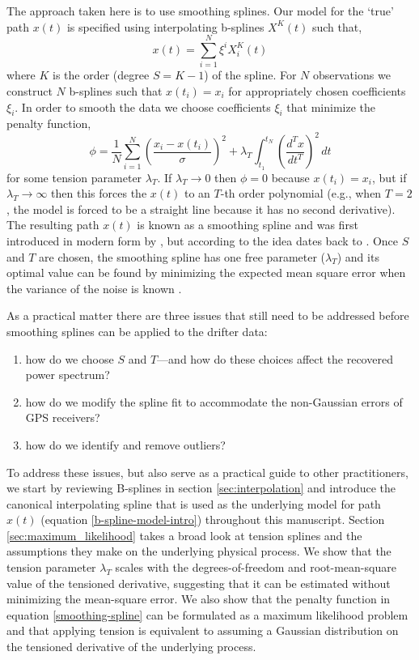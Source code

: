 \documentclass[10pt,journal]{IEEEtran}
\begin{document}
The approach taken here is to use smoothing splines. Our model for the `true' path $x(t)$ is specified using interpolating b-splines $X^K(t)$ such that,
\begin{equation}
\label{b-spline-model-intro}
    x(t) = \sum_{i=1}^N \xi^i X^K_i(t)
\end{equation}
where $K$ is the order (degree $S=K-1$) of the spline. For $N$ observations we construct $N$ b-splines such that $x(t_i)=x_i$ for appropriately chosen coefficients $\xi_i$. In order to smooth the data we choose coefficients $\xi_i$ that minimize the penalty function,
\begin{equation}
\label{smoothing-spline}
\phi =  \frac{1}{N}\sum_{i=1}^{N} \left( \frac{x_i - x(t_i)}{\sigma} \right) ^2 + \lambda_T \int_{t_1}^{t_N} \left(\frac{d^T x}{dt^T}\right)^2 \, dt
\end{equation}
for some tension parameter $\lambda_T$. If $\lambda_T \rightarrow 0$ then $\phi=0$ because $x(t_i)=x_i$, but if $\lambda_T \rightarrow \infty$ then this forces the $x(t)$ to an $T$-th order polynomial (e.g., when $T=2$, the model is forced to be a straight line because it has no second derivative). The resulting path $x(t)$ is known as a smoothing spline and was first introduced in modern form by \cite{reinsch1967-nm}, but according to \cite{deboor1978-book} the idea dates back to \cite{whittaker1923-pems}. Once $S$ and $T$ are chosen, the smoothing spline has one free parameter ($\lambda_T$) and its optimal value can be found by minimizing the expected mean square error when the variance of the noise is known \cite{craven1979-nm}.

As a practical matter there are three issues that still need to be addressed before smoothing splines can be applied to the drifter data:
\begin{enumerate}
    \item how do we choose $S$ and $T$---and how do these choices affect the recovered power spectrum?
    \item how do we modify the spline fit to accommodate the non-Gaussian errors of GPS receivers?
    \item how do we identify and remove outliers?
\end{enumerate}
To address these issues, but also serve as a practical guide to other practitioners, we start by reviewing B-splines in section \ref{sec:interpolation} and introduce the canonical interpolating spline that is used as the underlying model for path $x(t)$ (equation \ref{b-spline-model-intro}) throughout this manuscript. Section \ref{sec:maximum_likelihood} takes a broad look at tension splines and the assumptions they make on the underlying physical process. We show that the tension parameter $\lambda_T$ scales with the degrees-of-freedom and root-mean-square value of the tensioned derivative, suggesting that it can be estimated without minimizing the mean-square error. We also show that the penalty function in equation \ref{smoothing-spline} can be formulated as a maximum likelihood problem and that applying tension is equivalent to assuming a Gaussian distribution on the tensioned derivative of the underlying process.
\end{document}
